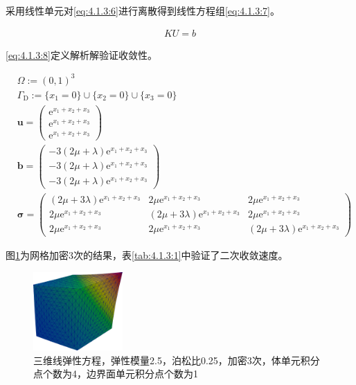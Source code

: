 采用线性单元对\eqref{eq:4.1.3:6}进行离散得到线性方程组\eqref{eq:4.1.3:7}。
   
\begin{align}\label{eq:4.1.3:7}
  KU = b
\end{align}

\eqref{eq:4.1.3:8}定义解析解验证收敛性。

\begin{equation}\label{eq:4.1.3:8}
  \begin{split}
    &\Omega:=(0,1)^3\\
    &\Gamma_{\mathrm D}:=\{x_1=0\}\cup\{x_2=0\}\cup\{x_3=0\} \\
    &\mathbf u = \left(\begin{array}{c} 
      \mathrm e^{x_1+x_2+x_3}\\
      \mathrm e^{x_1+x_2+x_3}\\
      \mathrm e^{x_1+x_2+x_3}
    \end{array}\right)\\
    &\mathbf b = \left(\begin{array}{c}
      -3  (2  \mu + \lambda)  \mathrm e^{x_1+x_2+x_3}\\
      -3  (2  \mu + \lambda)  \mathrm e^{x_1+x_2+x_3}\\
      -3  (2  \mu + \lambda)  \mathrm e^{x_1+x_2+x_3}
    \end{array}\right)\\
    &\mathbf \sigma 
    =\left(\begin{array}{ccc}
      (2\mu + 3\lambda)\mathrm e^{x_1+x_2+x_3} & 2\mu\mathrm e^{x_1+x_2+x_3} & 2\mu\mathrm e^{x_1+x_2+x_3}\\
      2\mu\mathrm e^{x_1+x_2+x_3} & (2\mu + 3\lambda)\mathrm e^{x_1+x_2+x_3} &  2\mu\mathrm e^{x_1+x_2+x_3}\\
      2\mu\mathrm e^{x_1+x_2+x_3} & 2\mu\mathrm e^{x_1+x_2+x_3} & (2\mu + 3\lambda)\mathrm e^{x_1+x_2+x_3}  
    \end{array}\right)
  \end{split}
\end{equation}

图\ref{fig:4.1.3:1}为网格加密3次的结果，表\ref{tab:4.1.3:1}中验证了二次收敛速度。

\begin{figure}[!htbp]
  \centering
  \includegraphics[height=3cm]{fig/4/4.1.3:1.png}
  \caption{三维线弹性方程，弹性模量2.5，泊松比0.25，加密3次，体单元积分点个数为4，边界面单元积分点个数为1}
  \label{fig:4.1.3:1}
\end{figure}

